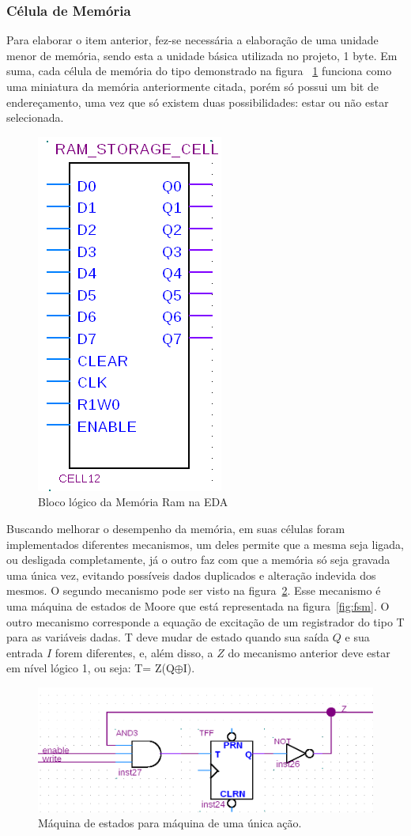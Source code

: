 \documentclass[12pt]{article}
\begin{document}
\subsubsection{Célula de Memória}

Para elaborar o item anterior, fez-se necessária a elaboração de uma unidade menor de memória, sendo esta a unidade básica utilizada no projeto, 1 byte. Em suma, cada célula de memória do tipo demonstrado na figura ~\ref{fig:celulamemoria} funciona como uma miniatura da memória anteriormente citada, porém só possui um bit de endereçamento, uma vez que só existem duas possibilidades: estar ou não estar selecionada.

\begin{figure}[h]
\centering
\includegraphics[width=.3\textwidth]{img/p4/celulamemoria.png}
\caption{Bloco lógico da Memória Ram na EDA}
\label{fig:celulamemoria}
\end{figure}

Buscando melhorar o desempenho da memória, em suas células foram implementados diferentes mecanismos, um deles permite que a mesma seja ligada, ou desligada completamente, já o outro faz com que a memória só seja gravada uma única vez, evitando possíveis dados duplicados e alteração indevida dos mesmos. O segundo mecanismo pode ser visto na figura~\ref{fig:ff1}. Esse mecanismo é uma máquina de estados de Moore que está representada na figura~\ref{fig:fsm}. O outro mecanismo corresponde a equação de excitação de um registrador do tipo T para as variáveis dadas. T deve mudar de estado quando sua saída $Q$ e sua entrada $I$ forem diferentes, e, além disso, a $Z$ do mecanismo anterior deve estar em nível lógico 1, ou seja: T= Z(Q$\oplus$I).

\begin{figure}[h]
\centering
\includegraphics[width=.8\textwidth]{img/p4/ff1.png}
\caption{Máquina de estados para máquina de uma única ação.}
\label{fig:ff1}
\end{figure}
\end{document}

